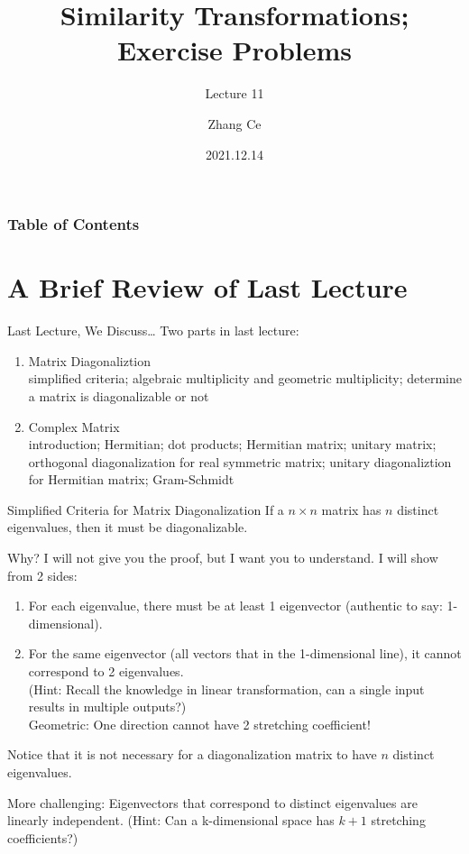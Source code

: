 \documentclass{beamer}
\title[Linear Algebra] %
{Similarity Transformations; Exercise Problems}
\subtitle{Lecture 11}
\author[zhangc2019@mail.sustech.edu.cn] %
{
    Zhang Ce
}
\institute[] %
{
    Department of Electrical and Electronic Engineering\\
    Southern University of Science and Technology
}
\date[2022.12.14] %
{2021.12.14}
\begin{document}
\frame{\titlepage}


\begin{frame}
\frametitle{Table of Contents}
\tableofcontents
\end{frame}
\section{A Brief Review of Last Lecture}
\begin{frame}{Last Lecture, We Discuss\dots}
Two parts in last lecture:
    \begin{enumerate}
        \item Matrix Diagonaliztion\\
        simplified criteria; algebraic multiplicity and geometric multiplicity; determine a matrix is diagonalizable or not
        \item Complex Matrix\\
        introduction; Hermitian; dot products; Hermitian matrix; unitary matrix; orthogonal diagonalization for real symmetric matrix; unitary diagonaliztion for Hermitian matrix; Gram-Schmidt
    \end{enumerate}

\end{frame}

\begin{frame}{Simplified Criteria for Matrix Diagonalization}
If a $n\times n$ matrix has $n$ distinct eigenvalues, then it must be diagonalizable.

\vspace{3pt}
Why? I will not give you the proof, but I want you to understand. I will show from 2 sides:

\begin{enumerate}
    \item For each eigenvalue, there must be at least 1 eigenvector (authentic to say: 1-dimensional).
    \item For the same eigenvector (all vectors that in the 1-dimensional line), it cannot correspond to 2 eigenvalues.\\
    (Hint: Recall the knowledge in linear transformation, can a single input results in multiple outputs?)\\
    Geometric: One direction cannot have 2 stretching coefficient!
\end{enumerate}

Notice that it is not necessary for a diagonalization matrix to have $n$ distinct eigenvalues.

\vspace{3pt}
More challenging: Eigenvectors that correspond to distinct eigenvalues are linearly independent. (Hint: Can a k-dimensional space has $k+1$ stretching coefficients?)

\end{frame}
\end{document}
